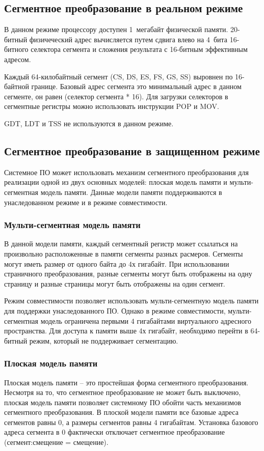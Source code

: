 \subsection{Сегментное преобразование в реальном режиме}
В данном режиме процессору доступен 1~мегабайт физической памяти. 20-битный физичеческий адрес вычисляется
путем сдвига влево на 4~бита 16-битного селектора сегмента и сложения результата с 16-битным эффективным адресом.

Каждый 64-килобайтный сегмент (CS, DS, ES, FS, GS, SS) выровнен по 16-байтной границе. Базовый адрес сегмента это
минимальный адрес в данном сегменте, он равен (селектор сегмента * 16). Для загрузки селекторов в сегментные регистры
можно использовать инструкции POP и MOV.

GDT, LDT и TSS не используются в данном режиме.

\subsection{Сегментное преобразование в защищенном режиме}
Системное ПО может использовать механизм сегментного преобразования для реализации одной из двух основных
моделей: плоская модель памяти и мульти-сегментная модель памяти. Данные модели памяти поддерживаются в
унаследованном режиме и в режиме совместимости.

\subsubsection*{Мульти-сегментная модель памяти}
В данной модели памяти, каждый сегментный регистр может ссылаться на произвольно расположенные в памяти сегменты разных расмеров.
Сегменты могут иметь размер от одного байта до 4х гигабайт. При использовании страничного преобразования, разные сегменты
могут быть отображены на одну страницу и разные страницы могут быть отображены на один сегмент.

Режим совместимости позволяет использовать мульти-сегментную модель памяти для поддержки унаследованного ПО.
Однако в режиме совместимости, мульти-сегментная модель ограничена первыми 4 гигабайтами виртуального
адресного пространства. Для доступа к памяти выше 4х гигабайт, необходимо перейти в 64-битный режим, который
не поддерживает сегментацию.

\subsubsection*{Плоская модель памяти}
Плоская модель памяти -- это простейшая форма сегментного преобразования. Несмотря на то, что сегментное преобразование
не может быть выключено, плоская модель памяти позволяет системному ПО обойти часть механизмов сегментного преобразования.
В плоской модели памяти все базовые адреса сегментов равны 0, а размеры сегментов равны 4 гигабайтам. Установка
базового адреса сегмента в 0 фактически отключает сегментное преобразование (сегмент:смещение = смещение).

